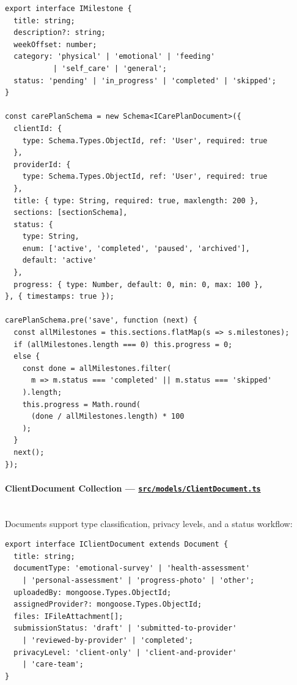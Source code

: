 \documentclass[12pt,letterpaper]{article}
\newcommand{\ghrepo}{https://github.com/omniV1/lunaraCare}
\begin{document}
\begin{lstlisting}[caption={CarePlan model with auto-progress hook (\texttt{CarePlan.ts})}]
export interface IMilestone {
  title: string;
  description?: string;
  weekOffset: number;
  category: 'physical' | 'emotional' | 'feeding'
           | 'self_care' | 'general';
  status: 'pending' | 'in_progress' | 'completed' | 'skipped';
}

const carePlanSchema = new Schema<ICarePlanDocument>({
  clientId: {
    type: Schema.Types.ObjectId, ref: 'User', required: true
  },
  providerId: {
    type: Schema.Types.ObjectId, ref: 'User', required: true
  },
  title: { type: String, required: true, maxlength: 200 },
  sections: [sectionSchema],
  status: {
    type: String,
    enum: ['active', 'completed', 'paused', 'archived'],
    default: 'active'
  },
  progress: { type: Number, default: 0, min: 0, max: 100 },
}, { timestamps: true });

carePlanSchema.pre('save', function (next) {
  const allMilestones = this.sections.flatMap(s => s.milestones);
  if (allMilestones.length === 0) this.progress = 0;
  else {
    const done = allMilestones.filter(
      m => m.status === 'completed' || m.status === 'skipped'
    ).length;
    this.progress = Math.round(
      (done / allMilestones.length) * 100
    );
  }
  next();
});
\end{lstlisting}

\paragraph{ClientDocument Collection --- \href{\ghrepo/blob/main/backend/src/models/ClientDocument.ts}{\texttt{src/models/ClientDocument.ts}}}
\mbox{}\\
Documents support type classification, privacy levels, and a status workflow:

\begin{lstlisting}[caption={ClientDocument model (\texttt{ClientDocument.ts})}]
export interface IClientDocument extends Document {
  title: string;
  documentType: 'emotional-survey' | 'health-assessment'
    | 'personal-assessment' | 'progress-photo' | 'other';
  uploadedBy: mongoose.Types.ObjectId;
  assignedProvider?: mongoose.Types.ObjectId;
  files: IFileAttachment[];
  submissionStatus: 'draft' | 'submitted-to-provider'
    | 'reviewed-by-provider' | 'completed';
  privacyLevel: 'client-only' | 'client-and-provider'
    | 'care-team';
}
\end{lstlisting}
\end{document}
